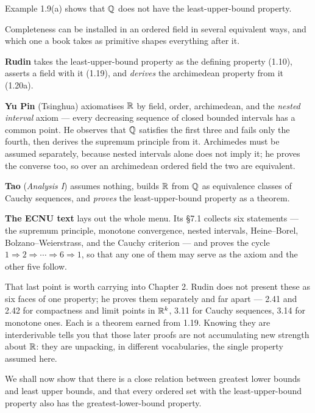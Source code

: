Example 1.9(a) shows that $\mathbb{Q}$ does not have the least-upper-bound property.

\begin{deeper}
Completeness can be installed in an ordered field in several equivalent ways,
and which one a book takes as primitive shapes everything after it.

\smallskip
\textbf{Rudin} takes the least-upper-bound property as the defining property
(1.10), asserts a field with it (1.19), and \emph{derives} the archimedean
property from it (1.20a).

\smallskip
\textbf{Yu Pin} (Tsinghua) axiomatises $\mathbb{R}$ by field, order, archimedean, and
the \emph{nested interval} axiom --- every decreasing sequence of closed bounded
intervals has a common point. He observes that $\mathbb{Q}$ satisfies the first three
and fails only the fourth, then derives the supremum principle from it.
Archimedes must be assumed separately, because nested intervals alone does not
imply it; he proves the converse too, so over an archimedean ordered field the
two are equivalent.

\smallskip
\textbf{Tao} (\emph{Analysis I}) assumes nothing, builds $\mathbb{R}$ from $\mathbb{Q}$ as
equivalence classes of Cauchy sequences, and \emph{proves} the
least-upper-bound property as a theorem.

\smallskip
\textbf{The ECNU text} lays out the whole menu. Its \S7.1 collects six
statements --- the supremum principle, monotone convergence, nested intervals,
Heine--Borel, Bolzano--Weierstrass, and the Cauchy criterion --- and proves the
cycle $1\Rightarrow2\Rightarrow\cdots\Rightarrow6\Rightarrow1$, so that any one
of them may serve as the axiom and the other five follow.

\smallskip
That last point is worth carrying into Chapter 2. Rudin does not present these
as six faces of one property; he proves them separately and far apart --- 2.41
and 2.42 for compactness and limit points in $\mathbb{R}^k$, 3.11 for Cauchy sequences,
3.14 for monotone ones. Each is a theorem earned from 1.19. Knowing they are
interderivable tells you that those later proofs are not accumulating new
strength about $\mathbb{R}$: they are unpacking, in different vocabularies, the single
property assumed here.
\end{deeper}

We shall now show that there is a close relation between greatest lower bounds
and least upper bounds, and that every ordered set with the least-upper-bound
property also has the greatest-lower-bound property.

